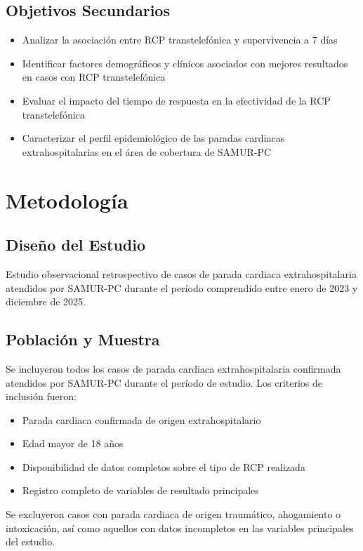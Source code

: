 \documentclass[10pt,a4paper]{article}
\begin{document}
\begin{multicols}{2}
\subsection{Objetivos Secundarios}
\begin{itemize}
\item Analizar la asociación entre RCP transtelefónica y supervivencia a 7 días
\item Identificar factores demográficos y clínicos asociados con mejores resultados en casos con RCP transtelefónica
\item Evaluar el impacto del tiempo de respuesta en la efectividad de la RCP transtelefónica
\item Caracterizar el perfil epidemiológico de las paradas cardiacas extrahospitalarias en el área de cobertura de SAMUR-PC
\end{itemize}

\section{Metodología}

\subsection{Diseño del Estudio}
Estudio observacional retrospectivo de casos de parada cardiaca extrahospitalaria atendidos por SAMUR-PC durante el período comprendido entre enero de 2023 y diciembre de 2025.

\subsection{Población y Muestra}
Se incluyeron todos los casos de parada cardiaca extrahospitalaria confirmada atendidos por SAMUR-PC durante el período de estudio. Los criterios de inclusión fueron:
\begin{itemize}
\item Parada cardiaca confirmada de origen extrahospitalario
\item Edad mayor de 18 años
\item Disponibilidad de datos completos sobre el tipo de RCP realizada
\item Registro completo de variables de resultado principales
\end{itemize}

Se excluyeron casos con parada cardiaca de origen traumático, ahogamiento o intoxicación, así como aquellos con datos incompletos en las variables principales del estudio.


\end{multicols}
\end{document}
